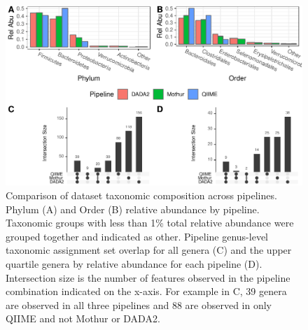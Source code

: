 \documentclass[12pt]{article}
\begin{document}
\begin{figure}
\centering
\includegraphics[width=0.9\linewidth]{pipeTaxa-1.pdf}
\caption{\label{fig:pipeTaxa} Comparison of dataset taxonomic composition
across pipelines. Phylum (A) and Order (B) relative abundance by
pipeline. Taxonomic groups with less than 1\% total relative abundance
were grouped together and indicated as other. Pipeline genus-level
taxonomic assignment set overlap for all genera (C) and the upper
quartile genera by relative abundance for each pipeline (D). Intersection size is
the number of features observed in the pipeline combination indicated on the x-axis.
For example in C, 39 genera are observed in all three pipelines and
88 are observed in only QIIME and not Mothur or DADA2.}
\end{figure}
\end{document}
